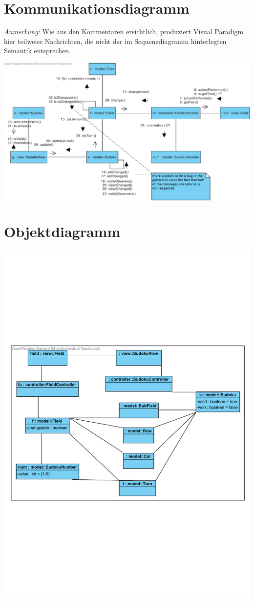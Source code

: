 \documentclass{scrartcl}
\begin{document}
\section{Kommunikationsdiagramm}

\emph{Anmerkung:} Wie aus den Kommentaren ersichtlich, produziert Visual
Paradigm hier teilweise Nachrichten, die nicht der im Sequenzdiagramm
hinterlegten Semantik entsprechen.

\includegraphics[width=\linewidth]{Sudoku-SD - Communications.pdf}

\section{Objektdiagramm}
\includegraphics[width=\linewidth]{Sudoku-ObjectDiagram.pdf}
\end{document}
